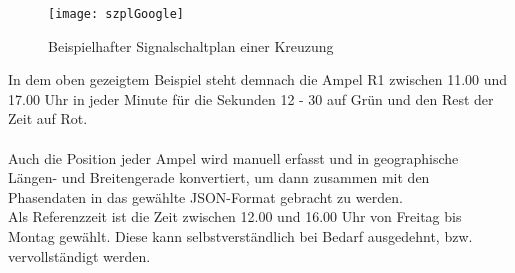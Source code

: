 \begin{figure}[H]
\centering
	\texttt{[image: szplGoogle]}
	\grayRule
	\caption[Signalplan]{Beispielhafter Signalschaltplan einer Kreuzung}
	\label{fig:plan}	
\end{figure}\vspace{7pt}
In dem oben gezeigtem Beispiel steht demnach die Ampel R1 zwischen 11.00 und 17.00 Uhr in jeder Minute für die Sekunden 12 - 30 auf Grün und den Rest der Zeit auf Rot.\\\\
Auch die Position jeder Ampel wird manuell erfasst und in geographische Längen- und Breitengerade konvertiert, um dann zusammen mit den Phasendaten in das gewählte \gls{JSON}-Format gebracht zu werden.\\
Als Referenzzeit ist die Zeit zwischen 12.00 und 16.00 Uhr von Freitag bis Montag gewählt. Diese kann selbstverständlich bei Bedarf ausgedehnt, bzw. vervollständigt werden.
%
%
